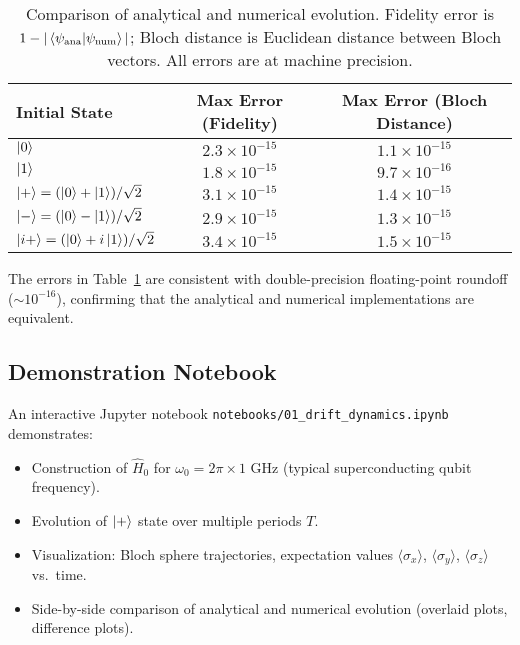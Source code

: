 \documentclass[11pt,a4paper]{article}
\theoremstyle{definition}
\theoremstyle{remark}
\begin{document}
\begin{table}[h]
\centering
\begin{tabular}{@{}lcc@{}}
\toprule
\textbf{Initial State} & \textbf{Max Error (Fidelity)} & \textbf{Max Error (Bloch Distance)} \\
\midrule
$\ket{0}$ & $2.3 \times 10^{-15}$ & $1.1 \times 10^{-15}$ \\
$\ket{1}$ & $1.8 \times 10^{-15}$ & $9.7 \times 10^{-16}$ \\
$\ket{+} = (\ket{0} + \ket{1})/\sqrt{2}$ & $3.1 \times 10^{-15}$ & $1.4 \times 10^{-15}$ \\
$\ket{-} = (\ket{0} - \ket{1})/\sqrt{2}$ & $2.9 \times 10^{-15}$ & $1.3 \times 10^{-15}$ \\
$\ket{i+} = (\ket{0} + i\ket{1})/\sqrt{2}$ & $3.4 \times 10^{-15}$ & $1.5 \times 10^{-15}$ \\
\bottomrule
\end{tabular}
\caption{Comparison of analytical and numerical evolution. Fidelity error is $1 - |\braket{\psi_{\text{ana}}}{\psi_{\text{num}}}|$; Bloch distance is Euclidean distance between Bloch vectors. All errors are at machine precision.}
\label{tab:validation}
\end{table}

The errors in Table~\ref{tab:validation} are consistent with double-precision floating-point roundoff ($\sim 10^{-16}$), confirming that the analytical and numerical implementations are equivalent.

\subsection{Demonstration Notebook}

An interactive Jupyter notebook \texttt{notebooks/01\_drift\_dynamics.ipynb} demonstrates:

\begin{itemize}
    \item Construction of $\hat{H}_0$ for $\omega_0 = 2\pi \times 1$ GHz (typical superconducting qubit frequency).
    \item Evolution of $\ket{+}$ state over multiple periods $T$.
    \item Visualization: Bloch sphere trajectories, expectation values $\langle \sigma_x \rangle$, $\langle \sigma_y \rangle$, $\langle \sigma_z \rangle$ vs.\ time.
    \item Side-by-side comparison of analytical and numerical evolution (overlaid plots, difference plots).
\end{itemize}
\end{document}
